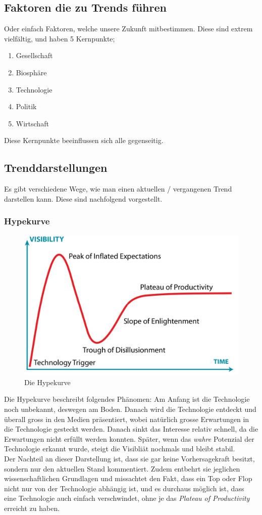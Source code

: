 \subsection{Faktoren die zu Trends führen}
Oder einfach Faktoren, welche unsere Zukunft mitbestimmen. Diese sind extrem vielfältig, und haben 5 Kernpunkte;
\begin{enumerate}
	\item Gesellschaft
	\item Biosphäre
	\item Technologie
	\item Politik
	\item Wirtschaft
\end{enumerate}
Diese Kernpunkte beeinflussen sich alle gegenseitig.
\subsection{Trenddarstellungen}
Es gibt verschiedene Wege, wie man einen aktuellen / vergangenen Trend darstellen kann. Diese sind nachfolgend vorgestellt.
\subsubsection{Hypekurve}
\begin{figure}
\centering
\includegraphics[width=0.7\linewidth]{fig/hype_kurve}
\caption{Die Hypekurve}
\label{fig:hype_kurve}
\end{figure}
Die Hypekurve beschreibt folgendes Phänomen: Am Anfang ist die Technologie noch unbekannt, deswegen am Boden. Danach wird die Technologie entdeckt und überall gross in den Medien präsentiert, wobei natürlich grosse Erwartungen in die Technologie gesteckt werden. Danach sinkt das Interesse relativ schnell, da die Erwartungen nicht erfüllt werden konnten. Später, wenn das \textit{wahre} Potenzial der Technologie erkannt wurde, steigt die Visibliät nochmals und bleibt stabil. \\
Der Nachteil an dieser Darstellung ist, dass sie gar keine Vorhersagekraft besitzt, sondern nur den aktuellen Stand kommentiert. Zudem entbehrt sie jeglichen wissenschaftlichen Grundlagen und missachtet den Fakt, dass ein Top oder Flop nicht nur von der Technologie abhängig ist, und es durchaus möglich ist, dass eine Technologie auch einfach verschwindet, ohne je das \textit{Plateau of Productivity} erreicht zu haben.
